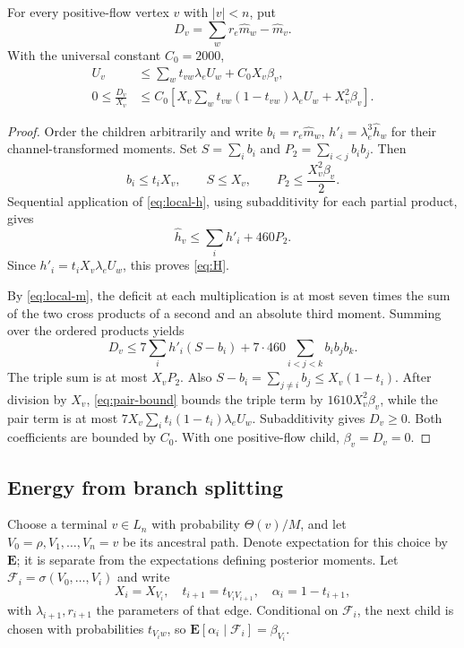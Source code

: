 \begin{lemma}\label{lem:deficit}
For every positive-flow vertex $v$ with $|v|<n$, put
\[
 D_v=\sum_w r_e\widehat m_w-\widehat m_v.
\]
With the universal constant $C_0=2000$,
\begin{align}
 U_v&\leq\sum_wt_{vw}\lambda_eU_w+C_0X_v\beta_v,
                       \label{eq:H}\\
 0\leq\frac{D_v}{X_v}
 &\leq C_0\left[X_v\sum_wt_{vw}(1-t_{vw})\lambda_eU_w
                     +X_v^2\beta_v\right].\label{eq:D}
\end{align}
\end{lemma}

\begin{proof}
Order the children arbitrarily and write
$b_i=r_e\widehat m_w$, $h'_i=\lambda_e^3\widehat h_w$ for
their channel-transformed moments. Set $S=\sum_i b_i$ and
$P_2=\sum_{i<j}b_ib_j$. Then
\begin{equation}\label{eq:pair-bound}
 b_i\leq t_iX_v,\qquad S\leq X_v,\qquad
 P_2\leq\frac{X_v^2\beta_v}{2}.
\end{equation}
Sequential application of \eqref{eq:local-h}, using subadditivity
for each partial product, gives
\[
 \widehat h_v\leq\sum_i h'_i+460P_2.
\]
Since $h'_i=t_iX_v\lambda_eU_w$, this proves \eqref{eq:H}.

By \eqref{eq:local-m}, the deficit at each multiplication is at
most seven times the sum of the two cross products of a second and
an absolute third moment. Summing over the ordered products yields
\[
 D_v\leq7\sum_i h'_i(S-b_i)
              +7\cdot460\sum_{i<j<k}b_ib_jb_k.
\]
The triple sum is at most $X_vP_2$. Also
$S-b_i=\sum_{j\ne i}b_j\leq X_v(1-t_i)$.
After division by $X_v$, \eqref{eq:pair-bound} bounds the
triple term by $1610X_v^2\beta_v$, while the pair term is
at most $7X_v\sum_i t_i(1-t_i)\lambda_eU_w$.
Subadditivity gives $D_v\geq0$. Both coefficients are bounded
by $C_0$. With one positive-flow child, $\beta_v=D_v=0$.
\end{proof}

\subsection{Energy from branch splitting}
Choose a terminal $v\in L_n$ with probability $\Theta(v)/M$,
and let $V_0=\rho,V_1,\ldots,V_n=v$ be its ancestral path.
Denote expectation for this choice by $\mathbf E$; it is separate
from the expectations defining posterior moments. Let
$\mathcal F_i=\sigma(V_0,\ldots,V_i)$ and write
\[
 X_i=X_{V_i},\quad t_{i+1}=t_{V_iV_{i+1}},\quad
 \alpha_i=1-t_{i+1},
\]
with $\lambda_{i+1},r_{i+1}$ the parameters of that edge.
Conditional on $\mathcal F_i$, the next child is chosen with
probabilities $t_{V_iw}$, so
$\mathbf E[\alpha_i\mid\mathcal F_i]=\beta_{V_i}$.

